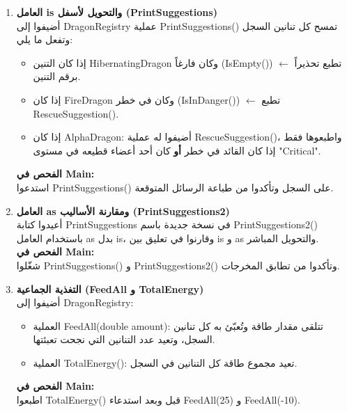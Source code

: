 \documentclass[14pt]{extarticle}
\begin{document}
\begin{enumerate}[resume, label=\textbf{تمرين \arabic*:}, wide=0pt, leftmargin=*, itemsep=2.2em]
    \item \textbf{العامل \textenglish{is} والتحويل لأسفل (\textenglish{PrintSuggestions})} \\
    أضيفوا إلى \textenglish{DragonRegistry} عملية \textenglish{PrintSuggestions()} تمسح كل تنانين السجل وتفعل ما يلي:
    \begin{itemize}
        \item إذا كان التنين \textenglish{HibernatingDragon} وكان فارغاً (\textenglish{IsEmpty()}) $\leftarrow$ تطبع تحذيراً برقم التنين.
        \item إذا كان \textenglish{FireDragon} وكان في خطر (\textenglish{IsInDanger()}) $\leftarrow$ تطبع \textenglish{RescueSuggestion()}.
        \item إذا كان \textenglish{AlphaDragon}: أضيفوا له عملية \textenglish{RescueSuggestion()}، واطبعوها فقط إذا كان القائد في خطر \textbf{أو} كان أحد أعضاء قطيعه في مستوى \textenglish{"Critical"}.
    \end{itemize}
    \textbf{الفحص في \textenglish{Main}:} \\
    استدعوا \textenglish{PrintSuggestions()} على السجل وتأكدوا من طباعة الرسائل المتوقعة.

    \item \textbf{العامل \textenglish{as} ومقارنة الأساليب (\textenglish{PrintSuggestions2})} \\
    أعيدوا كتابة \textenglish{PrintSuggestions} في نسخة جديدة باسم \textenglish{PrintSuggestions2()} باستخدام العامل \textenglish{as} بدل \textenglish{is}، وقارنوا في تعليق بين \textenglish{is} و \textenglish{as} والتحويل المباشر. \\
    \textbf{الفحص في \textenglish{Main}:} \\
    شغّلوا \textenglish{PrintSuggestions()} و \textenglish{PrintSuggestions2()} وتأكدوا من تطابق المخرجات.

    \item \textbf{التغذية الجماعية (\textenglish{FeedAll} و \textenglish{TotalEnergy})} \\
    أضيفوا إلى \textenglish{DragonRegistry}:
    \begin{itemize}
        \item العملية \textenglish{FeedAll(double amount)}: تتلقى مقدار طاقة وتُعبّئ به كل تنانين السجل، وتعيد عدد التنانين التي نجحت تعبئتها.
        \item العملية \textenglish{TotalEnergy()}: تعيد مجموع طاقة كل التنانين في السجل.
    \end{itemize}
    \textbf{الفحص في \textenglish{Main}:} \\
    اطبعوا \textenglish{TotalEnergy()} قبل وبعد استدعاء \textenglish{FeedAll(25)} و \textenglish{FeedAll(-10)}.


\end{enumerate}
\end{document}
